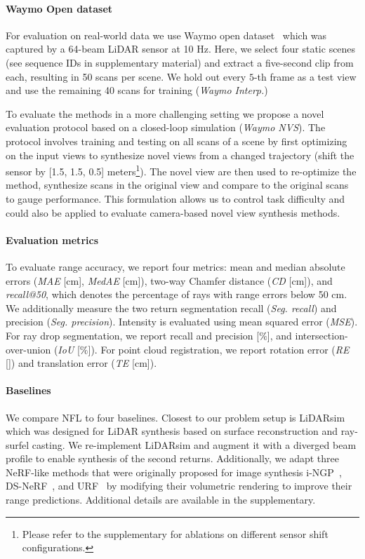 \paragraph{Waymo Open dataset}
 For evaluation on real-world data we use Waymo open dataset~\cite{sun2020scalability} which was captured by a 64-beam LiDAR sensor at 10 Hz. Here, we select four static scenes (see sequence IDs in supplementary material) and extract a five-second clip from each, resulting in 50 scans per scene. We hold out every $5$-th frame as a test view and use the remaining 40 scans for training (\textit{Waymo Interp.})
 
To evaluate the methods in a more challenging setting we propose a novel evaluation protocol based on a closed-loop simulation (\emph{Waymo NVS}). The protocol involves training and testing on all scans of a scene by first optimizing on the input views to synthesize novel views from a changed trajectory (shift the sensor by [1.5, 1.5, 0.5] meters\footnote{Please refer to the supplementary for ablations on different sensor shift configurations.}). The novel view are then used to re-optimize the method, synthesize scans in the original view and compare to the original scans to gauge performance. This formulation allows us to control task difficulty and could also be applied to evaluate camera-based novel view synthesis methods.



\paragraph{Evaluation metrics}
To evaluate range accuracy, we report four metrics: mean and median absolute errors (\textit{MAE} [cm], \textit{MedAE} [cm]),  two-way Chamfer distance (\textit{CD} [cm]), and \textit{recall@50}, which denotes the percentage of rays with range errors below 50 cm. 
We additionally measure the two return segmentation recall (\textit{Seg. recall}) and precision (\textit{Seg. precision}).
Intensity is evaluated using mean squared error (\textit{MSE}).
For ray drop segmentation, we report recall and precision [$\%$], and intersection-over-union (\textit{IoU} [$\%$]). For point cloud registration, we report rotation error (\textit{RE} [\degree]) and translation error (\textit{TE} [cm]).


\paragraph{Baselines}
We compare NFL to four baselines. Closest to our problem setup is LiDARsim~\cite{manivasagam2020lidarsim} which was designed for LiDAR synthesis based on surface reconstruction and ray-surfel casting. We re-implement LiDARsim and augment it with a diverged beam profile to enable synthesis of the second returns. Additionally, we adapt three NeRF-like methods that were originally proposed for image synthesis i-NGP~\cite{muller2022instant}, DS-NeRF~\cite{deng2021depth}, and URF~\cite{rematas2021urban} by modifying their volumetric rendering to improve their range predictions. 
Additional details are available in the supplementary.


